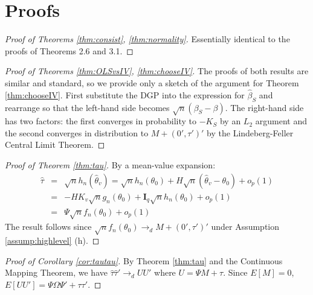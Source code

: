 \documentclass[12pt]{article}
\theoremstyle{definition}
\begin{document}






\appendix



\section{Proofs}



\begin{proof}[Proof of Theorems \ref{thm:consist}, \ref{thm:normality}]
Essentially identical to the proofs of \cite{NeweyMcFadden1994} Theorems 2.6 and 3.1.
\end{proof}

\begin{proof}[Proof of Theorems \ref{thm:OLSvsIV}, \ref{thm:chooseIV}]
The proofs of both results are similar and standard, so we provide only a sketch of the argument for Theorem \ref{thm:chooseIV}. 
First substitute the DGP into the expression for $\widehat{\beta}_S$ and rearrange so that the left-hand side becomes $\sqrt{n}(\beta_S - \beta)$. 
The right-hand side has two factors: the first converges in probability to $-K_S$ by an $L_2$ argument and the second converges in distribution to $M + (0', \tau')'$ by the Lindeberg-Feller Central Limit Theorem. 
\end{proof}

\begin{proof}[Proof of Theorem \ref{thm:tau}]
By a mean-value expansion:
	\begin{eqnarray*}
	\widehat{\tau} &=& \sqrt{n} h_n\left(\widehat{\theta}_{v}\right) = \sqrt{n}h_n(\theta_0) + H \sqrt{n}\left(\widehat{\theta}_{v} - \theta_0\right) + o_p(1)\\
		&=&-HK_{v} \sqrt{n}g_n(\theta_0) + \mathbf{I}_q\sqrt{n}h_n(\theta_0) +o_p(1)\\
		&=& \Psi \sqrt{n}f_n(\theta_0) + o_p(1) 
\end{eqnarray*}
The result follows since $\sqrt{n}f_n(\theta_0) \rightarrow_d M + (0', \tau')'$ under Assumption \ref{assump:highlevel} (h).
\end{proof}



\begin{proof}[Proof of Corollary \ref{cor:tautau}]
By Theorem \ref{thm:tau} and the Continuous Mapping Theorem, we have $\widehat{\tau}\widehat{\tau}' \rightarrow_d UU'$  where $U =\Psi M + \tau$. Since $E[M]=0$, $E[UU'] = \Psi \Omega \Psi' + \tau\tau'$. 
\end{proof}
\end{document}
